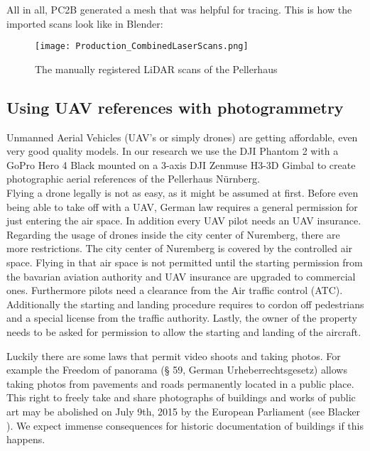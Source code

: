 All in all, PC2B generated a mesh that was helpful for tracing. This is how the imported scans look like in Blender:

\begin{figure}[h]
	\centering
	\texttt{[image: Production\_CombinedLaserScans.png]}
	\caption{The manually registered LiDAR scans of the Pellerhaus}
	\label{fig:production_laser_scans_combined}
\end{figure}




\subsection{Using UAV references with photogrammetry}

Unmanned Aerial Vehicles (UAV's or simply drones) are getting affordable, even very good quality models. In our research we use the DJI Phantom 2 with a GoPro Hero 4 Black mounted on a 3-axis DJI Zenmuse H3-3D Gimbal to create photographic aerial references of the Pellerhaus Nürnberg.\\

Flying a drone legally is not as easy, as it might be assumed at first. Before even being able to take off with a UAV, German law requires a general permission for just entering the air space. In addition every UAV pilot needs an UAV insurance.\\

Regarding the usage of drones inside the city center of Nuremberg, there are more restrictions. The city center of Nuremberg is covered by the controlled air space. Flying in that air space is not permitted until the starting permission from the bavarian aviation authority and UAV insurance are upgraded to commercial ones. Furthermore pilots need a clearance from the Air traffic control (ATC). Additionally the starting and landing procedure requires to cordon off pedestrians and a special license from the traffic authority. Lastly, the owner of the property needs to be asked for permission to allow the starting and landing of the aircraft.\\

\pagebreak

Luckily there are some laws that permit video shoots and taking photos. For example the Freedom of panorama (§ 59, German Urheberrechtsgesetz) allows taking photos from pavements and roads permanently located in a public place. This right to freely take and share photographs of buildings and works of public art may be abolished on July 9th, 2015 by the European Parliament (see Blacker \parencite{freedomOfPanoramaUnderAttack}). We expect immense consequences for historic documentation of buildings if this happens.\\

